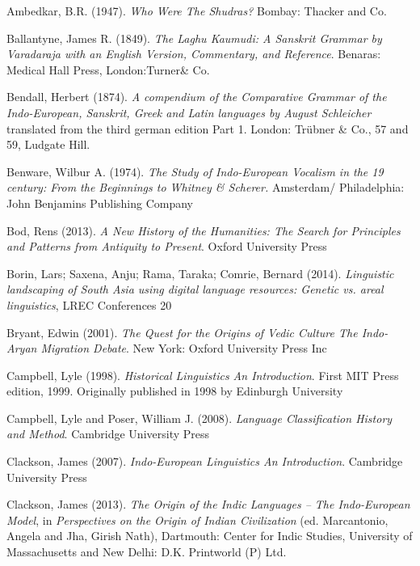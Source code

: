 \begin{thebibliography}{99}
 Ambedkar, B.R. (1947). \textit{Who Were The Shudras?} Bombay: Thacker and Co.

  Ballantyne, James R. (1849). \textit{The Laghu Kaumudi: A Sanskrit Grammar by Varadaraja with an English Version, Commentary, and Reference}. Benaras: Medical Hall Press, London:Turner\& Co. 

  Bendall, Herbert (1874). \textit{A compendium of the Comparative Grammar of the Indo-European, Sanskrit, Greek and Latin languages by August Schleicher} translated from the third german edition Part 1. London: Trübner \& Co., 57 and 59, Ludgate Hill. 

  Benware, Wilbur A. (1974). \textit{The Study of Indo-European Vocalism in the 19 century: From the Beginnings to Whitney \& Scherer.} Amsterdam/ Philadelphia: John Benjamins Publishing Company 

  Bod, Rens (2013). \textit{A New History of the Humanities: The Search for Principles and Patterns from Antiquity to Present}. Oxford University Press

  Borin, Lars; Saxena, Anju; Rama, Taraka; Comrie, Bernard (2014). \textit{Linguistic landscaping of South Asia using digital language resources: Genetic vs. areal linguistics}, LREC Conferences 20

  Bryant, Edwin (2001). \textit{The Quest for the Origins of Vedic Culture The Indo-Aryan Migration Debate}. New York: Oxford University Press Inc

  Campbell, Lyle (1998). \textit{Historical Linguistics An Introduction}. First MIT Press edition, 1999. Originally published in 1998 by Edinburgh University

  Campbell, Lyle and Poser, William J. (2008). \textit{Language Classification History and Method}. Cambridge University Press

  Clackson, James (2007). \textit{Indo-European Linguistics An Introduction}. Cambridge University Press

  Clackson, James (2013). \textit{The Origin of the Indic Languages – The Indo-European Model}, in \textit{Perspectives on the Origin of Indian Civilization} (ed. Marcantonio, Angela and Jha, Girish Nath), Dartmouth: Center for Indic Studies, University of Massachusetts and New Delhi: D.K. Printworld (P) Ltd.


\end{thebibliography}
